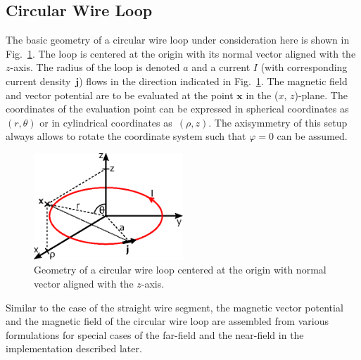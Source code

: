 \subsection{Circular Wire Loop}
\label{sec:methods_cwl}
The basic geometry of a circular wire loop under consideration here is shown in Fig.~\ref{fig:circularWireLoop}.
The loop is centered at the origin with its normal vector aligned with the $z$-axis.
The radius of the loop is denoted $a$ and a current $I$ (with corresponding current density~$\mathbf{j}$)
flows in the direction indicated in Fig.~\ref{fig:circularWireLoop}.
The magnetic field and vector potential are to be evaluated at the point $\mathbf{x}$ in the ($x$, $z$)-plane.
The coordinates of the evaluation point can be expressed in spherical coordinates as~$(r, \theta)$
or in cylindrical coordinates as~$(\rho, z)$.
The axisymmetry of this setup always allows to rotate the coordinate system such that $\varphi=0$ can be assumed.
\begin{figure}[htbp]
 \centering
 \includegraphics[width=0.5\textwidth]{img/circularWireLoop.eps}
 \caption{Geometry of a circular wire loop centered at the origin with normal vector aligned with the $z$-axis.}
 \label{fig:circularWireLoop}
\end{figure}
Similar to the case of the straight wire segment,
the magnetic vector potential and the magnetic field of the circular wire loop
are assembled from various formulations for special cases of the far-field and the near-field
in the implementation described later.

